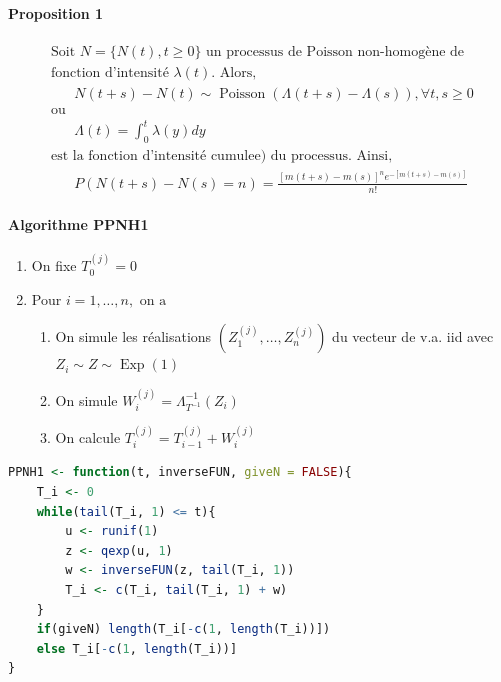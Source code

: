 \paragraph{Proposition 1}
$$\begin{array}{l}{\text { Soit } N=\{N(t), t \geq 0\} \text { un processus de Poisson non-homogène de }} \\ {\text { fonction d'intensité } \lambda(t) . \text { Alors, }} \\ {\qquad N(t+s)-N(t) \sim \operatorname{Poisson}(\Lambda(t+s)-\Lambda(s)), \forall t, s \geq 0} \\ {\text { ou }} \\ {\qquad \Lambda(t)=\int_{0}^{t} \lambda(y) d y} \\ {\text { est la fonction d'intensité cumulee) du processus. Ainsi, }} \\ {\qquad P(N(t+s)-N(s)=n)=\frac{[m(t+s)-m(s)]^{n} e^{-[m(t+s)-m(s)]}}{n !}}\end{array}$$

\paragraph{Algorithme PPNH1}
\begin{enumerate}
    \item On fixe $T_{0}^{(j)}=0$
    \item Pour $i=1, \ldots, n, \text { on a } $
    \begin{enumerate}[label=2.\arabic*]
        \item On simule les réalisations $\left(Z_{1}^{(j)}, \ldots, Z_{n}^{(j)}\right)$ 
              du vecteur de v.a. iid avec $Z_{i} \sim Z \sim \operatorname{Exp}(1)$
        \item On simule $W_{i}^{(j)}=\Lambda_{T^{-1}}^{-1}\left(Z_{i}\right)$
        \item On calcule $T_{i}^{(j)}=T_{i-1}^{(j)}+W_{i}^{(j)}$
    \end{enumerate}
\end{enumerate}
\begin{lstlisting}[language=R, caption={Mise en oeuvre de PPNH1 en R}]
PPNH1 <- function(t, inverseFUN, giveN = FALSE){
    T_i <- 0
    while(tail(T_i, 1) <= t){
        u <- runif(1)
        z <- qexp(u, 1)
        w <- inverseFUN(z, tail(T_i, 1))
        T_i <- c(T_i, tail(T_i, 1) + w)
    }
    if(giveN) length(T_i[-c(1, length(T_i))])
    else T_i[-c(1, length(T_i))]
}
\end{lstlisting}

